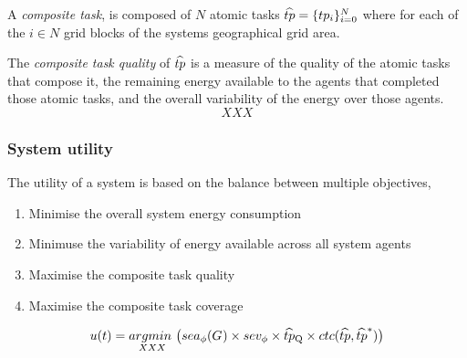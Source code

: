 \begin{definition}
	A \textit{composite task}, is composed of $N$ atomic tasks $\varCompositeTask{}{} = \lbrace \varAtomicTask{i}{} \rbrace_{i=0}^N$ where for each of the $i\in N$ grid blocks of the systems geographical grid area.
\end{definition}

\begin{definition}
	The \textit{composite task quality} of $\varCompositeTask{}{}$ is a measure of the quality of the atomic tasks that compose it, the remaining energy available to the agents that completed those atomic tasks, and the overall variability of the energy over those agents. 
	\begin{equation}
		XXX
	\end{equation}
\end{definition}


\newcommand{\functionSystemUtility}[2]{u(t)}

\subsubsection{System utility}

The utility of a system is based on the balance between multiple objectives,
\begin{enumerate}
	\item Minimise the overall system energy consumption
	\item Minimuse the variability of energy available across all system agents
	\item Maximise the composite task quality
	\item Maximise the composite task coverage
\end{enumerate}

\begin{definition}
	
	\begin{equation}
		\functionSystemUtility{}{} = \argmin{XXX}{}
		\big( 
		\functionSystemEnergyAvailable{}{}
		\times \varSystemEnergyVariability{}{}
		\times \varCompositeTask{Q}{}
		\times \functionCompositeTaskCoverage{}{}
		\big)
	\end{equation}
\end{definition}

